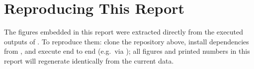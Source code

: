 \documentclass[11pt,a4paper]{report}
\begin{document}
\section{Reproducing This Report}
The figures embedded in this report were extracted directly from the executed outputs of
. To reproduce them: clone the repository above, install dependencies
from , and execute  end to end (e.g.\ via
); all figures and
printed numbers in this report will regenerate identically from the current data.
\end{document}
